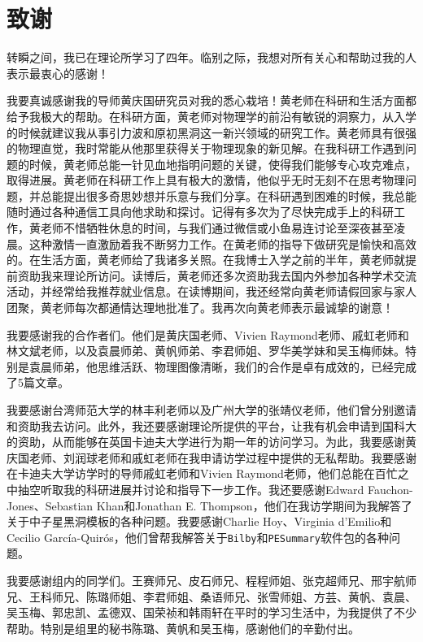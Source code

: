 \chapter[致谢]{致\quad 谢}%
转瞬之间，我已在理论所学习了四年。临别之际，我想对所有关心和帮助过我的人表示最衷心的感谢！

我要真诚感谢我的导师黄庆国研究员对我的悉心栽培！黄老师在科研和生活方面都给予我极大的帮助。在科研方面，黄老师对物理学的前沿有敏锐的洞察力，从入学的时候就建议我从事引力波和原初黑洞这一新兴领域的研究工作。黄老师具有很强的物理直觉，我时常能从他那里获得关于物理现象的新见解。在我科研工作遇到问题的时候，黄老师总能一针见血地指明问题的关键，使得我们能够专心攻克难点，取得进展。黄老师在科研工作上具有极大的激情，他似乎无时无刻不在思考物理问题，并总能提出很多奇思妙想并乐意与我们分享。在科研遇到困难的时候，我总能随时通过各种通信工具向他求助和探讨。记得有多次为了尽快完成手上的科研工作，黄老师不惜牺牲休息的时间，与我们通过微信或小鱼易连讨论至深夜甚至凌晨。这种激情一直激励着我不断努力工作。在黄老师的指导下做研究是愉快和高效的。在生活方面，黄老师给了我诸多关照。在我博士入学之前的半年，黄老师就提前资助我来理论所访问。读博后，黄老师还多次资助我去国内外参加各种学术交流活动，并经常给我推荐就业信息。在读博期间，我还经常向黄老师请假回家与家人团聚，黄老师每次都通情达理地批准了。我再次向黄老师表示最诚挚的谢意！

我要感谢我的合作者们。他们是黄庆国老师、Vivien Raymond老师、戚虹老师和林文斌老师，以及袁晨师弟、黄帆师弟、李君师姐、罗华美学妹和吴玉梅师妹。特别是袁晨师弟，他思维活跃、物理图像清晰，我们的合作是卓有成效的，已经完成了5篇文章。


我要感谢台湾师范大学的林丰利老师以及广州大学的张靖仪老师，他们曾分别邀请和资助我去访问。此外，我还要感谢理论所提供的平台，让我有机会申请到国科大的资助，从而能够在英国卡迪夫大学进行为期一年的访问学习。为此，我要感谢黄庆国老师、刘润球老师和戚虹老师在我申请访学过程中提供的无私帮助。我要感谢在卡迪夫大学访学时的导师戚虹老师和Vivien Raymond老师，他们总能在百忙之中抽空听取我的科研进展并讨论和指导下一步工作。我还要感谢Edward Fauchon-Jones、Sebastian Khan和Jonathan E. Thompson，他们在我访学期间为我解答了关于中子星黑洞模板的各种问题。我要感谢Charlie Hoy、Virginia d'Emilio和Cecilio García-Quirós，他们曾帮我解答关于\texttt{Bilby}和\texttt{PESummary}软件包的各种问题。

我要感谢组内的同学们。王赛师兄、皮石师兄、程程师姐、张克超师兄、邢宇航师兄、王科师兄、陈璐师姐、李君师姐、桑语师兄、张雪师姐、方芸、黄帆、袁晨、吴玉梅、郭忠凯、孟德双、国荣祯和韩雨轩在平时的学习生活中，为我提供了不少帮助。特别是组里的秘书陈璐、黄帆和吴玉梅，感谢他们的辛勤付出。

